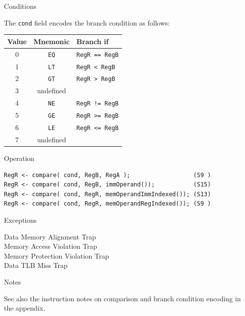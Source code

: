 \begin{iPageDescEntry}{Conditions}

The \texttt{cond} field encodes the branch condition as follows:

\begin{center}
\begin{tabular}{|c|c|l|}
\hline
\textbf{Value}  & \textbf{Mnemonic} & \textbf{Branch if} \\ \hline
0 & \texttt{EQ} & \texttt{RegR == RegB} \\ \hline
1 & \texttt{LT} & \texttt{RegR <  RegB} \\ \hline
2 & \texttt{GT} & \texttt{RegR > RegB} \\ \hline
3 &  undefined    & \\ \hline
4 & \texttt{NE} & \texttt{RegR != RegB} \\ \hline
5 &  \texttt{GE} & \texttt{RegR >= RegB} \\ \hline
6 & \texttt{LE} & \texttt{RegR <=  RegB} \\ \hline
7 & undefined    & \\ \hline
\end{tabular}
\end{center}
\end{iPageDescEntry}

\begin{iPageDescOpEntry}{Operation}
\begin{lstlisting}[style=iPageOpStyle]
RegR <- compare( cond, RegB, RegA );                  (S9 )
RegR <- compare( cond, RegB, immOperand());           (S15)
RegR <- compare( cond, RegR, memOperandImmIndexed()); (S13) 
RegR <- compare( cond, RegR, memOperandRegIndexed()); (S9 )
\end{lstlisting}
\end{iPageDescOpEntry}

\begin{iPageDescEntry}{Exceptions}{

 	Data Memory Alignment Trap\\
	Memory Access Violation Trap\\
	Memory Protection Violation Trap\\
	Data TLB Miss Trap
}
\end{iPageDescEntry}

\begin{iPageDescEntry}{Notes}{

See also the instruction notes on comparison and branch condition encoding in the appendix.
}

\end{iPageDescEntry}
